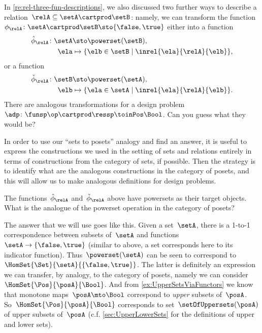 In \cref{re:rel-three-fun-descriptions}, we also discussed two further ways to describe a relation~$\relA \subseteq \setA \cartprod \setB$: namely, we can transform the function~$\phi_{\relA}\colon \setA \cartprod\setB \sto \{ \false, \true \}$ either into a function
\begin{equation}
    \label{eq:curried-relation-again}
    \begin{aligned}
        \hat \phi_{\relA} \colon \setA & \sto \powerset (\setB)                                       , \\
        \ela                           & \mapsto \{ \elb \in \setB \mid \inrel{\ela}{\relA}{\elb} \},
    \end{aligned}
\end{equation}
or a function
\begin{equation}
    \label{eq:co-curried-relation-again}
    \begin{aligned}
        \check \phi_{\relA} \colon \setB & \sto \powerset (\setA)                                      , \\
        \elb                             & \mapsto \{ \ela \in \setA \mid \inrel{\ela}{\relA}{\elb}\}.
    \end{aligned}
\end{equation}
%
There are analogous transformations for a design problem~$\adp\colon \funsp\op \cartprod \ressp\toinPos \Bool$.
Can you guess what they would be?

In order to use our ``sets to posets'' analogy and find an answer, it is useful to express the constructions we used in the setting of sets and relations entirely in terms of constructions from the category of sets, if possible.
Then the strategy is to identify what are the analogous constructions in the category of posets, and this will allow us to make analogous definitions for design problems.

The functions~$\hat \phi_{\relA}$ and~$\check \phi_{\relA}$ above have powersets as their target objects.
What is the analogue of the powerset operation in the category of posets?

The answer that we will use goes like this.
Given a set~$\setA$, there is a 1-to-1 correspondence between subsets of~$\setA$ and functions~$\setA \to \{ \false, \true \}$ (similar to above, a set corresponds here to its indicator function).
Thus~$\powerset (\setA)$ can be seen to correspond to~$\HomSet{\Set}{\setA}{\{ \false, \true\}}$.
The latter is definitely an expression we can transfer, by analogy, to the category of posets, namely we can consider~$\HomSet{\Pos}{\posA}{\Bool}$.
And from \cref{ex:UpperSetsViaFunctors} we know that monotone maps~$\posA \mto \Bool$ correspond to \emph{upper} subsets of~$\posA$.
So~$\HomSet{\Pos}{\posA}{\Bool}$ corresponds to set~$\setOfUppersets (\posA)$ of upper subsets of~$\posA$ (c.f.
\cref{sec:UpperLowerSets} for the definitions of upper and lower sets).

